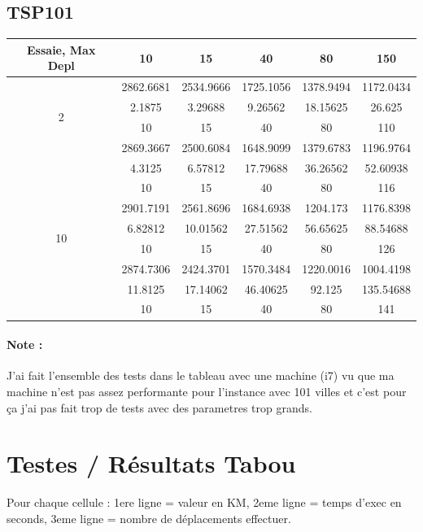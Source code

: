 \documentclass[12pt]{article}
\begin{document}
            \subsection{TSP101}
            \begin{tabular}{|c|c|c|c|c|c|}
                \hline
                {Essaie, Max Depl} & 10 & 15 & 40 & 80 & 150 \\ \hline
                \multirow{4}{*}{2} & 2862.6681 & 2534.9666 & 1725.1056 & 1378.9494 & 1172.0434  \\ & 2.1875 & 3.29688 & 9.26562 & 18.15625 & 26.625  \\ & 10 & 15 & 40 & 80 & 110  \\\hline
                \multirow{4}{*}{5} & 2869.3667 & 2500.6084 & 1648.9099 & 1379.6783 & 1196.9764  \\ & 4.3125 & 6.57812 & 17.79688 & 36.26562 & 52.60938  \\ & 10 & 15 & 40 & 80 & 116  \\\hline
                \multirow{4}{*}{10} & 2901.7191 & 2561.8696 & 1684.6938 & 1204.173 & 1176.8398  \\ & 6.82812 & 10.01562 & 27.51562 & 56.65625 & 88.54688  \\ & 10 & 15 & 40 & 80 & 126  \\\hline
                \multirow{4}{*}{30} & 2874.7306 & 2424.3701 & 1570.3484 & 1220.0016 & 1004.4198  \\ & 11.8125 & 17.14062 & 46.40625 & 92.125 & 135.54688  \\ & 10 & 15 & 40 & 80 & 141  \\\hline
            \end{tabular}
            \paragraph{Note :\\}
            J'ai fait l'ensemble des tests dans le tableau avec une machine (i7) vu que ma machine n'est pas assez performante pour l'instance avec 101 villes et c'est pour ça j'ai pas fait trop de tests avec des parametres trop grands.
        \section{Testes / Résultats Tabou}
            Pour chaque cellule : 1ere ligne = valeur en KM, 2eme ligne = temps d'exec en seconds, 3eme ligne = nombre de déplacements effectuer. \\
\end{document}

